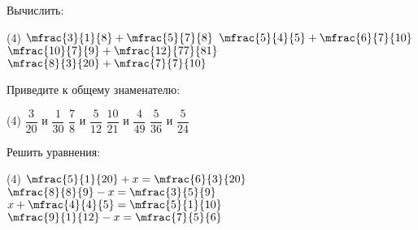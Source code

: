 %
%
\begin{class}[number=6]
	\begin{listofex}
		\item Вычислить:
		\begin{tasks}(4)
			\task \( \mfrac{3}{1}{8}+\mfrac{5}{7}{8} \)
			\task \( \mfrac{5}{4}{5}+\mfrac{6}{7}{10} \)
			\task \( \mfrac{10}{7}{9}+\mfrac{12}{77}{81} \)
			\task \( \mfrac{8}{3}{20}+\mfrac{7}{7}{10}\)
		\end{tasks}
		\item Приведите к общему знаменателю:
		\begin{tasks}(4)
			\task \( \dfrac{3}{20} \) и \( \dfrac{1}{30} \)
			\task \( \dfrac{7}{8} \) и \( \dfrac{5}{12} \)
			\task \( \dfrac{10}{21} \) и \( \dfrac{4}{49} \)
			\task \( \dfrac{5}{36} \) и \( \dfrac{5}{24} \)
		\end{tasks}
		\item Решить уравнения:
		\begin{tasks}(4)
			\task \( \mfrac{5}{1}{20}+x=\mfrac{6}{3}{20} \)
			\task \( \mfrac{8}{8}{9}-x=\mfrac{3}{5}{9} \)
			\task \( x+\mfrac{4}{4}{5}=\mfrac{5}{1}{10} \)
			\task \( \mfrac{9}{1}{12}-x=\mfrac{7}{5}{6} \)
		\end{tasks}
	\end{listofex}
\end{class}
%
%
%
%
%
%

